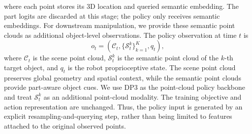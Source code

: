 where each point stores its 3D location and queried semantic embedding. The part logits are discarded at this stage; the policy only receives semantic embeddings. For downstream manipulation, we provide these semantic point clouds as additional object-level observations. The policy observation at time $t$ is
\begin{equation}
  o_t=(\mathcal{C}_t,\{\mathcal{S}_t^k\}_{k=1}^{K},q_t),
\end{equation}
where $\mathcal{C}_t$ is the scene point cloud, $\mathcal{S}_t^k$ is the semantic point cloud of the $k$-th target object, and $q_t$ is the robot proprioceptive state. The scene point cloud preserves global geometry and spatial context, while the semantic point clouds provide part-aware object cues. We use DP3 as the
point-cloud policy backbone and treat $\mathcal{S}_t^k$ as an additional point-cloud modality. The training objective and action representation are unchanged. Thus, the policy input is generated by an explicit resampling-and-querying step, rather than being limited to features attached to the original observed points.

